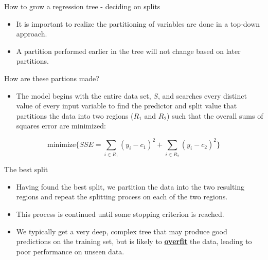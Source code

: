 \documentclass[
  10pt,
  ignorenonframetext,
]{beamer}
\providecommand{\tightlist}{%
  \setlength{\itemsep}{0pt}\setlength{\parskip}{0pt}}
\begin{document}
\begin{frame}{How to grow a regression tree - deciding on splits}
\protect\hypertarget{how-to-grow-a-regression-tree---deciding-on-splits}{}

\begin{itemize}
\tightlist
\item
  It is important to realize the partitioning of variables are done in a
  top-down approach.
\item
  A partition performed earlier in the tree will not change based on
  later partitions.
\end{itemize}

\begin{block}{How are these partions made?}

\begin{itemize}
\tightlist
\item
  The model begins with the entire data set, \(S\), and searches every
  distinct value of every input variable to find the predictor and split
  value that partitions the data into two regions (\(R_1\) and \(R_2\))
  such that the overall sums of squares error are minimized:
\end{itemize}

\[
\text{minimize}\{SSE=\sum\limits_{i\in R_1}(y_i - c_1)^2 + \sum\limits_{i\in R_2} (y_i - c_2)^2 \}
\]

\end{block}

\end{frame}

\begin{frame}{The best split}
\protect\hypertarget{the-best-split}{}

\begin{itemize}
\tightlist
\item
  Having found the best split, we partition the data into the two
  resulting regions and repeat the splitting process on each of the two
  regions.
\item
  This process is continued until some stopping criterion is reached.
\item
  We typically get a very deep, complex tree that may produce good
  predictions on the training set, but is likely to
  \href{https://www.researchgate.net/post/What_is_over_fitting_in_decision_tree}{\textbf{overfit}}
  the data, leading to poor performance on unseen data.
\end{itemize}

\end{frame}
\end{document}
